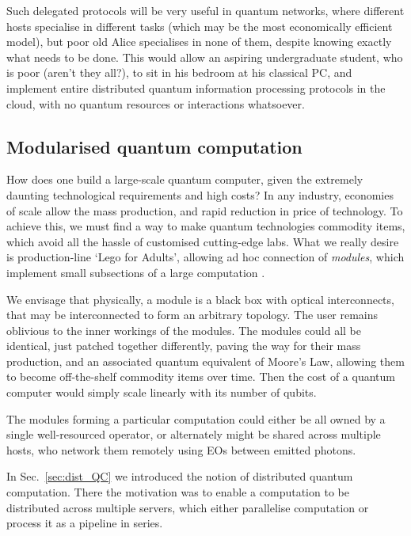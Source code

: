 \documentclass[aps,rmp,twocolumn,amsmath,amssymb,nofootinbib,superscriptaddress,longbibliography,floatfix,table-of-contents,eqsecnum]{revtex4-1}
\begin{document}
Such delegated protocols will be very useful in quantum networks, where different hosts specialise in different tasks (which may be the most economically efficient model), but poor old Alice specialises in none of them, despite knowing exactly what needs to be done. This would allow an aspiring undergraduate student, who is poor (aren't they all?), to sit in his bedroom at his classical PC, and implement entire distributed quantum information processing protocols in the cloud, with no quantum resources or interactions whatsoever.

%
%

\subsection{Modularised quantum computation} \label{sec:module} 

How does one build a large-scale quantum computer, given the extremely daunting technological requirements and high costs? In any industry, economies of scale allow the mass production, and rapid reduction in price of technology. To achieve this, we must find a way to make quantum technologies commodity items, which avoid all the hassle of customised cutting-edge labs. What we really desire is production-line `Lego for Adults{\texttrademark}', allowing ad hoc connection of \textit{modules}, which implement small subsections of a large computation \cite{bib:FowlerPrivate}.

We envisage that physically, a module is a black box with optical interconnects, that may be interconnected to form an arbitrary topology. The user remains oblivious to the inner workings of the modules. The modules could all be identical, just patched together differently, paving the way for their mass production, and an associated quantum equivalent of Moore's Law, allowing them to become off-the-shelf commodity items over time. Then the cost of a quantum computer would simply scale linearly with its number of qubits.

The modules forming a particular computation could either be all owned by a single well-resourced operator, or alternately might be shared across multiple hosts, who network them remotely using EOs between emitted photons.

In Sec.~\ref{sec:dist_QC} we introduced the notion of distributed quantum computation. There the motivation was to enable a computation to be distributed across multiple servers, which either parallelise computation or process it as a pipeline in series.
\end{document}
